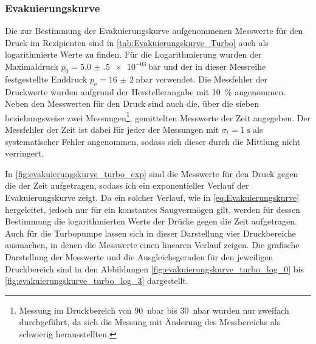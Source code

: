 \subsubsection{Evakuierungskurve}
Die zur Bestimmung der Evakuierungskurve aufgenommenen Messwerte für den Druck
im Rezipienten sind in \cref{tab:Evakuierungskurve_Turbo} auch als logarithmierte
Werte zu finden. Für die Logarithmierung wurden der Maximaldruck $p_{0} =\SI{5.0(5)e-03}{\bar} $
und der in dieser Messreihe festgestellte Enddruck $p_{\mathrm{e}} =\SI{16(2)}{\nano\bar}$ verwendet.
Die Messfehler der Druckwerte wurden aufgrund der Herstellerangabe \cite{DatenblattV70} mit \SI{10}{\percent} angenommen.
Neben den Messwerten für den Druck sind auch die, über die sieben beziehungsweise zwei Messungen\footnote{
Messung im Druckbereich von \SI{90}{\nano\bar} bis \SI{30}{\nano\bar} wurden nur zweifach durchgeführt,
da sich die Messung mit Änderung des Messbereichs als schwierig herausstellten.}, 
gemittelten Messwerte der Zeit angegeben. Der Messfehler der Zeit ist dabei für jeder der Messungen mit
$\sigma_{t} = \SI{1}{\s}$ als systematischer Fehler angenommen, sodass sich dieser durch die Mittlung nicht verringert.


In \cref{fig:evakuierungskurve_turbo_exp} sind die Messwerte für den Druck gegen die der Zeit aufgetragen,
sodass ich ein exponentieller Verlauf der Evakuierungskurve zeigt. Da ein solcher Verlauf, wie in 
\eqref{eq:Evakuierungskurve} hergeleitet, jedoch nur für ein konstantes Saugvermögen gilt, werden für dessen Bestimmung die logarithmierten Werte der Drücke gegen die Zeit aufgetragen.
Auch für die Turbopumpe lassen sich in dieser Darstellung vier Druckbereiche ausmachen,
in denen die Messwerte einen linearen Verlauf zeigen. Die grafische Darstellung der Messwerte und die 
Ausgleichsgeraden für den jeweiligen Druckbereich sind in den Abbildungen \ref{fig:evakuierungskurve_turbo_log_0} 
bis \ref{fig:evakuierungskurve_turbo_log_3} dargestellt.\\

{%

\FloatBarrier}

{%

\FloatBarrier

\FloatBarrier

\FloatBarrier

\FloatBarrier}

